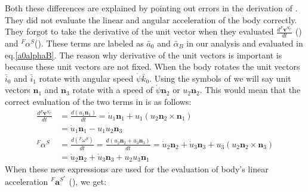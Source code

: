 \documentclass[a4paper,10pt]{article}
\begin{document}
Both these differences are explained by pointing out errors in the derivation
of \cite{kim2005dynamic}. They did not evaluate the linear and angular acceleration of the body correctly. They forgot to take the derivative
of the unit vector when they evaluated $\frac{d{}^F\mathbf{v}^{S_C}}{dt}$ (\cite[eq.~10]{kim2005dynamic}) and ${}^F\alpha^S$(\cite[eq.~9]{kim2005dynamic}).
These terms are labeled as $\bar{a}_0$ and $\bar\alpha_B$ in our analysis and evaluated in eq.\ref{a0alphaB}. The reason why derivative of the
unit vectors is important is because these unit vectors are not fixed. When the body rotates the unit vectors $\bar{i}_0$ and $\bar{i}_1$ rotate
with angular speed $\dot\psi\bar{k}_0$. Using the symbols of \cite{kim2005dynamic} we will say unit vectors $\mathbf{n}_1$ and $\mathbf{n}_3$
rotate with a speed of $\dot\psi\mathbf{n}_2$ or $u_2\mathbf{n}_2$. This would mean that the correct evaluation of the two terms in \cite{kim2005dynamic} is as follows:
\begin{align}
 \frac{d{}^F\mathbf{v}^{S_C}}{dt} &= \frac{d\left(u_1\mathbf{n}_1\right)}{dt} = \dot{u}_1\mathbf{n}_1 + u_1\left(u_2\mathbf{n}_2 \times \mathbf{n}_1\right) \nonumber \\
  &= \dot{u}_1\mathbf{n}_1 - u_1u_2\mathbf{n}_3 \nonumber \\
 {}^F\alpha^S &= \frac{d\left({}^F\omega^S\right)}{dt} = \frac{d\left(u_2\mathbf{n}_2+u_3\mathbf{n}_3\right)}{dt}
 = \dot{u}_2\mathbf{n}_2+\dot{u}_3\mathbf{n}_3+u_3\left(u_2\mathbf{n}_2 \times \mathbf{n}_3\right) \nonumber \\
 &= \dot{u}_2\mathbf{n}_2+\dot{u}_3\mathbf{n}_3+u_2u_3\mathbf{n}_1 \nonumber 
\end{align}
When these new expressions are used for the evaluation of body's linear acceleration ${}^F\mathbf{a}^{S^*}$ 
(\cite[eq.~10]{kim2005dynamic}), we get:
\end{document}
